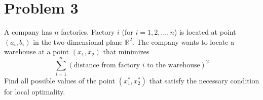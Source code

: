 \section*{Problem 3}
A company has $n$ factories. Factory $i$ (for $i=1,2,...,n$) is located at point $(a_i,b_i)$ in the two-dimensional plane $\mathbb R^2$. The company wants to locate a warehouse at a point $(x_1,x_2)$ that minimizes 
\begin{equation}
\nonumber
\sum_{i=1}^n (\text{distance from factory } i \text{ to the warehouse})^2
\end{equation}
Find all possible values of the point  $(x_1^*,x_2^*)$ that satisfy the necessary condition for local optimality. 